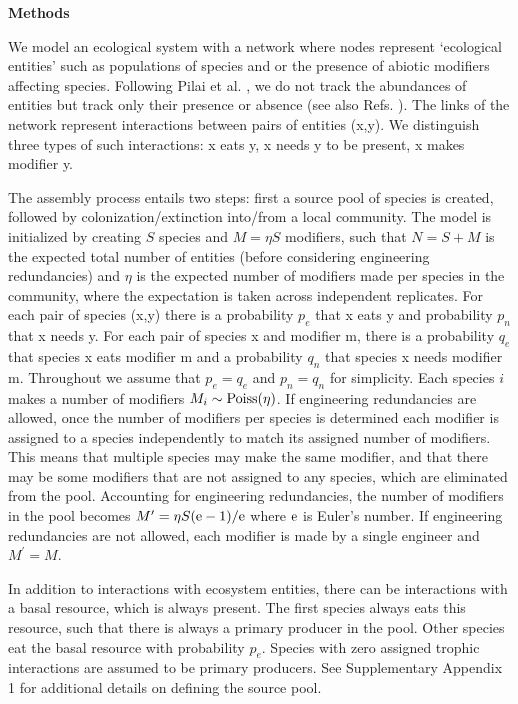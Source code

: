 \documentclass[twocolumn,preprintnumbers,amsmath,amssymb,superscriptaddress,linenumbers]{revtex4-1}
\newcommand{\rr}[1]{{\rm #1}}
\begin{document}
\vspace{-2mm}
\noindent \textbf{Methods}\\
  \footnotesize{
  We model an ecological system with a network where nodes represent `ecological entities' such as populations of species and or the presence of abiotic modifiers affecting species.
  Following Pilai et al. \cite{Pillai2011}, we do not track the abundances of entities but track only their presence or absence (see also Refs. \cite{Luh1993,Campbell2011}).
  The links of the network represent interactions between pairs of entities (x,y).
  We distinguish three types of such interactions: x eats y, x needs y to be present, x makes modifier y.

  The assembly process entails two steps: first a source pool of species is created, followed by colonization/extinction into/from a local community.
  The model is initialized by creating $S$ species and $M = \eta S$ modifiers, such that $N=S+M$ is the expected total number of entities (before considering engineering redundancies) and $\eta$ is the expected number of modifiers made per species in the community, where the expectation is taken across independent replicates.
  For each pair of species (x,y) there is a probability $p_e$ that x eats y and probability $p_n$ that x needs y.
  For each pair of species x and modifier m, there is a probability $q_e$ that species x eats modifier m and a probability $q_n$ that species x needs modifier m.
  Throughout we assume that $p_e = q_e$ and $p_n = q_n$ for simplicity.
  Each species $i$ makes a number of modifiers $M_i \sim \rr{Poiss}(\eta)$. %
  If engineering redundancies are allowed, once the number of modifiers per species is determined each modifier is assigned to a species independently to match its assigned number of modifiers.
  This means that multiple species may make the same modifier, and that there may be some modifiers that are not assigned to any species, which are eliminated from the pool.
  Accounting for engineering redundancies, the number of modifiers in the pool becomes $M^\prime = \eta S (\rr{e}-1)/\rr{e}$ where $\rr{e}$ is Euler's number.
  If engineering redundancies are not allowed, each modifier is made by a single engineer and $M^\prime = M$.
  
  In addition to interactions with ecosystem entities, there can be interactions with a basal resource, which is always present.
  The first species always eats this resource, such that there is always a primary producer in the pool.
  Other species eat the basal resource with probability $p_e$.
  Species with zero assigned trophic interactions are assumed to be primary producers.
  See Supplementary Appendix 1 for additional details on defining the source pool.

}
\end{document}

